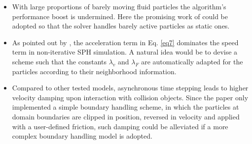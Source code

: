 \documentclass[
	11pt, 
	DIV10,
	ngerman,
	a4paper, 
	oneside, 
	headings=normal, 
	captions=tableheading,
	final, 
	numbers=noenddot
]{scrartcl}
\begin{document}
\begin{itemize}
    \item With large proportions of barely moving fluid particles the algorithm's performance boost is undermined. Here the promising work of \cite{goswami2014regional} could be adopted so that the solver handles barely active particles as static ones.
    \item As pointed out by \cite{bender2010boundary}, the acceleration term in Eq. \eqref{eq7} dominates the speed term in non-iterative SPH simulation. A natural idea would be to devise a scheme such that the constants $ \lambda_{v} $ and $ \lambda_{F} $ are automatically adapted for the particles according to their neighborhood information.
    \item Compared to other tested models, asynchronous time stepping leads to higher velocity damping upon interaction with collision objects. Since the paper only implemented a simple boundary handling scheme, in which the particles at domain boundaries are clipped in position, reversed in velocity and applied with a user-defined friction, such damping could be alleviated if a more complex boundary handling model is adopted.
\end{itemize}



\end{document}
